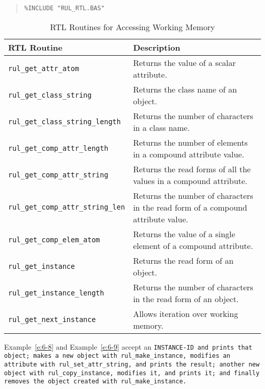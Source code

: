 \begin{quote}
\begin{verbatim}
%INCLUDE "RUL_RTL.BAS"
\end{verbatim}
\end{quote}

\begin{table}[h]
  \begin{tabularx}{\columnwidth}{lX}
    \toprule
    RTL Routine & Description \\
    \midrule
    \verb|rul_get_attr_atom| & Returns the value of a scalar attribute. \\
    \verb|rul_get_class_string| & Returns the class name of an object. \\
    \verb|rul_get_class_string_length|  & Returns the number of characters 
                                          in a class name. \\
    \verb|rul_get_comp_attr_length| & Returns the number of elements in a compound
                                      attribute value. \\
    \verb|rul_get_comp_attr_string| & Returns the read forms of all the values in a
                                      compound attribute. \\
    \verb|rul_get_comp_attr_string_len| & Returns the number of characters in the
                                          read form of a compound attribute value. \\
    \verb|rul_get_comp_elem_atom| & Returns the value of a single element of a
                                    compound attribute. \\
    \verb|rul_get_instance| & Returns the read form of an object. \\
    \verb|rul_get_instance_length| & Returns the number of characters in the
                                     read form of an object. \\
    \verb|rul_get_next_instance| & Allows iteration over working memory. \\
    \bottomrule
  \end{tabularx}
  \caption{RTL Routines for Accessing Working Memory}
  \label{t:6-5}
\end{table}

Example~\ref{e:6-8} and Example~\ref{e:6-9} accept an \tt{INSTANCE-ID}
and prints that object; makes a new object with
\verb|rul_make_instance|, modifies an attribute with
\verb|rul_set_attr_string|, and prints the result; another new object
with \verb|rul_copy_instance|, modifies it, and prints it; and finally
removes the object created with \verb|rul_make_instance|.

